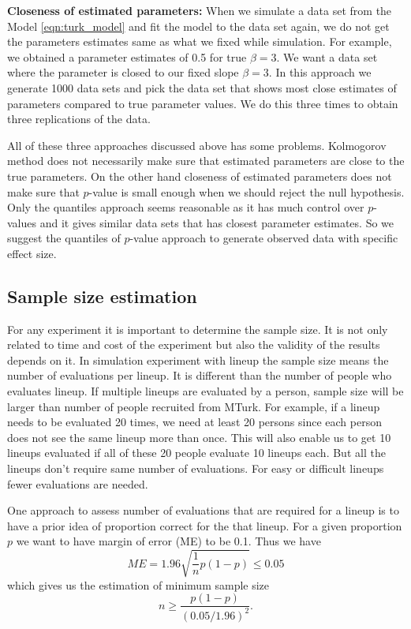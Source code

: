 \documentclass[11pt]{article}
\begin{document}
{\bf Closeness of estimated parameters:} When we simulate a data set from the Model \eqref{eqn:turk_model} and fit the model to the data set again, we do not get the parameters estimates same as what we fixed while simulation. For example, we obtained a parameter estimates of 0.5 for true $\beta=3$. We want a data set where the parameter is closed to our fixed slope $\beta=3$.  In this approach we generate 1000 data sets and pick the data set that shows most close estimates of parameters compared to true parameter values. We do this three times to obtain three replications of the data.

All of these three approaches discussed above has some problems. Kolmogorov method does not necessarily make sure that estimated parameters are close to the true parameters. On the other hand closeness of estimated parameters does not make sure that $p$-value is small enough when we should reject the null hypothesis. Only the quantiles approach seems reasonable as it has much control over $p$-values and it gives similar data sets that has closest parameter estimates. So we suggest the quantiles of $p$-value approach to generate observed data with specific effect size.

\subsection{Sample size estimation} For any experiment it is important to determine the sample size. It is not only related to time and cost of the experiment but also the validity of the results depends on it. In simulation experiment with lineup the sample size means the number of evaluations per lineup. It is different than the number of people who evaluates lineup. If multiple lineups are evaluated by a person, sample size will be larger than number of people recruited from MTurk. For example, if a lineup needs to be evaluated 20 times, we need at least 20 persons since each person does not see the same lineup more than once. This will also enable us to get 10 lineups evaluated if all of these 20 people evaluate 10 lineups each. But all the lineups don't require same number of evaluations. For easy or difficult lineups fewer evaluations are needed.

One approach to assess number of evaluations that are required for a lineup is to have a prior idea of proportion correct for the that lineup. For a given proportion $p$ we want to have margin of error (ME) to be 0.1. Thus we have $$ME =1.96 \sqrt{ \frac 1 n p(1-p)} \le 0.05$$ which gives us the estimation of minimum sample size $$n \geq \frac{p(1-p)}{(0.05/1.96)^2}.$$ 
\end{document}
